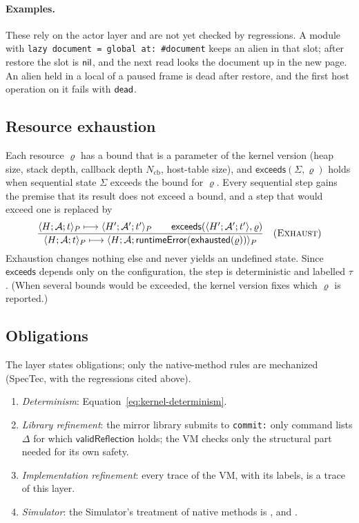 \paragraph{Examples.}
These rely on the actor layer and are not yet checked by regressions.
A module with \texttt{lazy document = global at: \#document} keeps an alien
in that slot; after restore the slot is $\mathsf{nil}$, and the next read looks the
document up in the new page.  An alien held in a local of a paused frame is
dead after restore, and the first host operation on it fails with
$\mathsf{dead}$.

\subsection{Resource exhaustion}

Each resource $\varrho$ has a bound that is a parameter of the kernel version
(heap size, stack depth, callback depth $N_{\mathrm{cb}}$, host-table size),
and $\mathsf{exceeds}(\Sigma,\varrho)$ holds when sequential state $\Sigma$
exceeds the bound for $\varrho$.  Every sequential step gains the premise that
its result does not exceed a bound, and a step that would exceed one is
replaced by
\[
\dfrac{\langle H;\mathcal A;t\rangle_P\longmapsto
       \langle H';\mathcal A';t'\rangle_P
       \qquad\mathsf{exceeds}(\langle H';\mathcal A';t'\rangle,\varrho)}
 {\langle H;\mathcal A;t\rangle_P\longmapsto
  \langle H;\mathcal A;\mathsf{runtimeError}(\mathsf{exhausted}(\varrho))\rangle_P}
\quad(\textsc{Exhaust})
\]
Exhaustion changes nothing else and never yields an undefined state.  Since
$\mathsf{exceeds}$ depends only on the configuration, the step is
deterministic and labelled $\tau$.  (When several bounds would be exceeded,
the kernel version fixes which $\varrho$ is reported.)

\subsection{Obligations}

The layer states obligations; only the native-method rules are mechanized
(SpecTec, with the regressions cited above).
\begin{enumerate}
\item \emph{Determinism}: Equation~\eqref{eq:kernel-determinism}.
\item \emph{Library refinement}: the mirror library submits to \texttt{commit:}
      only command lists $\Delta$ for which $\mathsf{validReflection}$ holds;
      the VM checks only the structural part needed for its own safety.
\item \emph{Implementation refinement}: every trace of the VM, with its
      labels, is a trace of this layer.
\item \emph{Simulator}: the Simulator's treatment of native methods is
      ,  and
      .
\end{enumerate}
